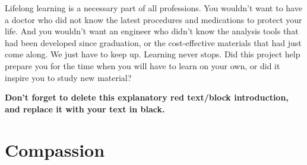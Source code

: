 \begin{tcolorbox}[
    boxrule=0pt,    %
    colback=white,
    coltext=red
]
    Lifelong learning is a necessary part of all professions. You wouldn’t want to have a doctor who did not know the latest procedures and medications to protect your life. And you wouldn’t want an engineer who didn’t know the analysis tools that had been developed since graduation, or the cost-effective materials that had just come along. We just have to keep up. Learning never stops. Did this project help prepare you for the time when you will have to learn on your own, or did it inspire you to study new material?
    
    \vspace{15pt}       %
    \begin{center}      %
    \textbf{Don't forget to delete this explanatory red text/block introduction, and replace it with your text in black.}
    \end{center}        %
\end{tcolorbox}         %

\section{Compassion} %

